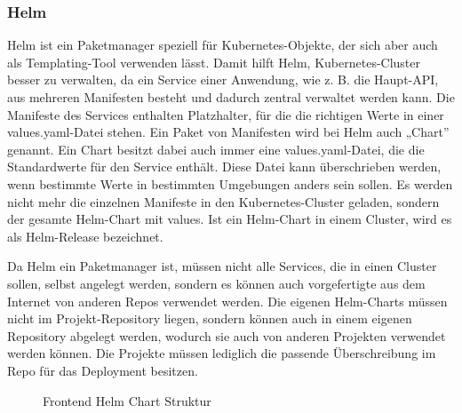 \subsubsection{Helm}

Helm ist ein Paketmanager speziell für Kubernetes-Objekte, der sich aber auch als Templating-Tool verwenden lässt.
Damit hilft Helm, Kubernetes-Cluster besser zu verwalten, da ein Service einer Anwendung, wie z. B. die Haupt-API, aus mehreren Manifesten besteht und dadurch zentral verwaltet werden kann.
Die Manifeste des Services enthalten Platzhalter, für die die richtigen Werte in einer values.yaml-Datei stehen. Ein Paket von Manifesten wird bei Helm auch „Chart” genannt.
Ein Chart besitzt dabei auch immer eine values.yaml-Datei, die die Standardwerte für den Service enthält. Diese Datei kann überschrieben werden, wenn bestimmte Werte in bestimmten Umgebungen anders sein sollen.
Es werden nicht mehr die einzelnen Manifeste in den Kubernetes-Cluster geladen, sondern der gesamte Helm-Chart mit values. Ist ein Helm-Chart in einem Cluster, wird es als Helm-Release bezeichnet. 

Da Helm ein Paketmanager ist, müssen nicht alle Services, die in einen Cluster sollen, selbst angelegt werden, sondern es können auch vorgefertigte aus dem Internet von anderen Repos verwendet werden. 
Die eigenen Helm-Charts müssen nicht im Projekt-Repository liegen, sondern können auch in einem eigenen Repository abgelegt werden, wodurch sie auch von anderen Projekten verwendet werden können. Die Projekte müssen lediglich die passende Überschreibung im Repo für das Deployment besitzen.
\begin{figure}[htbp]


\caption{Frontend Helm Chart Struktur}
\label{fig:helmstruktur}

\end{figure}
\FloatBarrier